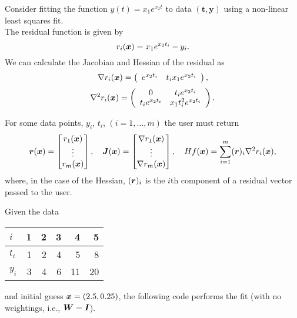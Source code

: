 
Consider fitting the function $y(t) = x_1e^{x_2 t}$ to data $(\bm{t}, \bm{y})$
using a non-linear least squares fit.\\
The residual function is given by
$$
   r_i({\bm x})  = x_1 e^{x_2 t_i} - y_i.
$$
We can calculate the Jacobian and Hessian of the residual as
$$
   \nabla r_i({\bm x}) = \left(\begin{array}{cc}
      e^{x_2 t_i} &
      t_i x_1 e^{x_2 t_i}
      \end{array}\right),
$$
$$
   \nabla^2 r_i({\bm x}) = \left(\begin{array}{cc}
      0                 & t_i e^{x_2 t_i}    \\
      t_i e^{x_2 t_i}     & x_1 t_i^2 e^{x_2 t_i}
   \end{array}\right).
$$

For some data points, $y_i$, $t_i$, $(i = 1,\dots,m)$ the user must return
$$  {\bm r}({\bm x}) = \begin{bmatrix}
      r_1({\bm x})\\
      \vdots \\
      r_m({\bm x})
    \end{bmatrix}, \quad   {\bm J}({\bm x}) = 
    \begin{bmatrix}
      \nabla r_1({\bm x}) \\
      \vdots \\
      \nabla r_m({\bm x}) \\
    \end{bmatrix}, \quad 
    Hf({\bm x}) = 
    \sum_{i=1}^m
    ({\bm r})_i \nabla^2 r_i({\bm x}),
$$
where, in the case of the Hessian, $({\bm r})_i$ is the $i$th component of a residual vector passed to the user.

Given the data
\begin{center}
   \begin{tabular}{l|*{5}{r}}
      $i$   & 1 & 2 & 3  & 4  & 5 \\
      \hline
      $t_i$ & 1 & 2 & 4  & 5  & 8 \\
      $y_i$ & 3 & 4 & 6 & 11 & 20
   \end{tabular}
\end{center}
and initial guess ${\bm x} = (2.5, 0.25)$, the following code performs the fit (with no 
weightings, i.e., ${\bm W} = {\bm I}$).

